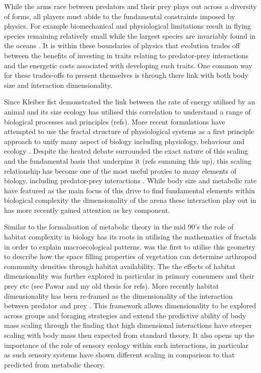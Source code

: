 While the arms race between predators and their prey plays out across a diversity of forms, all players must abide to the fundamental constraints imposed by physics. For example biomechanical and physiological limitations result in flying species remaining relatively small \citep{chatterjee2007aerodynamics,dudley2002mechanisms} while the largest species are invariably found in the oceans \citep{heim2015cope}. It is within these boundaries of physics that evolution trades off between the benefits of investing in traits relating to predator-prey interactions and the energetic costs associated with developing such traits. One common way for these trades-offs to present themselves is through there link with both body size and interaction dimensionality.


Since Kleiber fist demonstrated the link between the rate of energy utilised by an animal and its size \citep{kleiber1947body} ecology has utilised this correlation to understand a range of biological processes and principles (refs). More recent formulations have attempted to use the fractal structure of physiological systems as a first principle approach to unify many aspect of biology including physiology, behaviour and ecology \citep{west1997general,brown2004}. Despite the heated debate surrounded the exact nature of this scaling and the fundamental basis that underpins it (refs summing this up), this scaling relationship has become one of the most useful proxies to many elements of biology, including predator-prey interactions \citep{brown2004}. While body size and metabolic rate have featured as the main focus of this drive to find fundamental elements within biological complexity the dimensionality of the arena these interaction play out in has more recently gained attention as key component.


Similar to the formalisation of metabolic theory in the mid 90's the role of habitat complexity in biology has its roots in utilising the mathematics of fractals in order to explain macroecological patterns. \cite{morse1985fractal} was the first to utilise this geometry to describe how the space filling properties of vegetation can determine arthropod community densities through habitat availability. The the effects of habitat dimensionality was further explored in particular in primary consumers and their prey etc (see Pawar and my old thesis for refs). More recently habitat dimensionality has been re-framed as the dimensionality of the interaction between predator and prey \citep{pawar2012dimensionality}. This framework allows dimensionality to be explored across groups and foraging strategies and extend the predictive ability of body mass scaling through the finding that high dimensional interactions have steeper scaling with body mass then expected from standard theory. It also opens up the importance of the role of sensory ecology within such interactions, in particular as such sensory systems have shown different scaling in comparison to that predicted from metabolic theory. %


